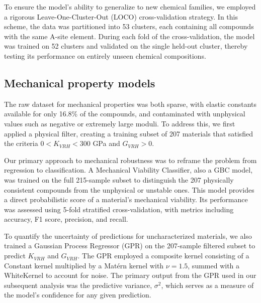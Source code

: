 \documentclass[]{article}
\begin{document}
To ensure the model's ability to generalize to new chemical families, we employed a rigorous Leave-One-Cluster-Out (LOCO) cross-validation strategy. In this scheme, the data was partitioned into 53 clusters, each containing all compounds with the same A-site element. During each fold of the cross-validation, the model was trained on 52 clusters and validated on the single held-out cluster, thereby testing its performance on entirely unseen chemical compositions.

\subsection{Mechanical property models}
The raw dataset for mechanical properties was both sparse, with elastic constants available for only 16.8\% of the compounds, and contaminated with unphysical values such as negative or extremely large moduli. To address this, we first applied a physical filter, creating a training subset of 207 materials that satisfied the criteria $0 < K_{VRH} < 300$ GPa and $G_{VRH} > 0$.

Our primary approach to mechanical robustness was to reframe the problem from regression to classification. A Mechanical Viability Classifier, also a GBC model, was trained on the full 215-sample subset to distinguish the 207 physically consistent compounds from the unphysical or unstable ones. This model provides a direct probabilistic score of a material's mechanical viability. Its performance was assessed using 5-fold stratified cross-validation, with metrics including accuracy, F1 score, precision, and recall.

To quantify the uncertainty of predictions for uncharacterized materials, we also trained a Gaussian Process Regressor (GPR) on the 207-sample filtered subset to predict $K_{VRH}$ and $G_{VRH}$. The GPR employed a composite kernel consisting of a Constant kernel multiplied by a Mat\'{e}rn kernel with $\nu=1.5$, summed with a WhiteKernel to account for noise. The primary output from the GPR used in our subsequent analysis was the predictive variance, $\sigma^2$, which serves as a measure of the model's confidence for any given prediction.
\end{document}
